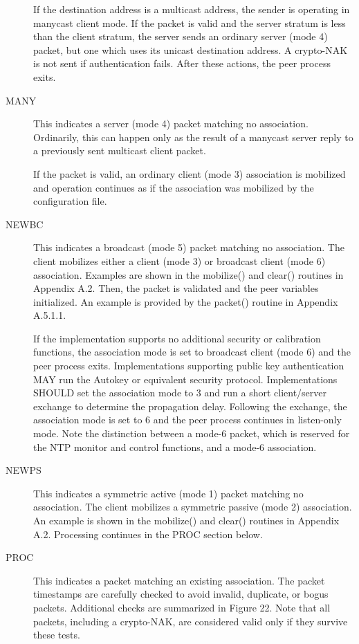 \begin{description}
    If the destination address is a multicast address, the sender is
    operating in manycast client mode. If the packet is valid and the
    server stratum is less than the client stratum, the server sends an
    ordinary server (mode 4) packet, but one which uses its unicast
    destination address. A crypto-NAK is not sent if authentication
    fails. After these actions, the peer process exits.

  \item[MANY] This indicates a server (mode 4) packet matching no
    association. Ordinarily, this can happen only as the result of a
    manycast server reply to a previously sent multicast client packet.

    If the packet is valid, an ordinary client (mode 3) association is
    mobilized and operation continues as if the association was mobilized
    by the configuration file.

  \item[NEWBC] This indicates a broadcast (mode 5) packet matching no
    association. The client mobilizes either a client (mode 3) or
    broadcast client (mode 6) association. Examples are shown in the
    mobilize() and clear() routines in Appendix A.2. Then, the packet is
    validated and the peer variables initialized. An example is provided
    by the packet() routine in Appendix A.5.1.1.

    If the implementation supports no additional security or calibration
    functions, the association mode is set to broadcast client (mode 6)
    and the peer process exits. Implementations supporting public key
    authentication MAY run the Autokey or equivalent security protocol.
    Implementations SHOULD set the association mode to 3 and run a short
    client/server exchange to determine the propagation delay. Following
    the exchange, the association mode is set to 6 and the peer process
    continues in listen-only mode. Note the distinction between a mode-6
    packet, which is reserved for the NTP monitor and control functions,
    and a mode-6 association.

  \item[NEWPS] This indicates a symmetric active (mode 1) packet matching no
    association. The client mobilizes a symmetric passive (mode 2)
    association. An example is shown in the mobilize() and clear()
    routines in Appendix A.2. Processing continues in the PROC section
    below.

  \item[PROC] This indicates a packet matching an existing association. The
    packet timestamps are carefully checked to avoid invalid, duplicate,
    or bogus packets. Additional checks are summarized in Figure 22.
    Note that all packets, including a crypto-NAK, are considered valid
    only if they survive these tests.


\end{description}
